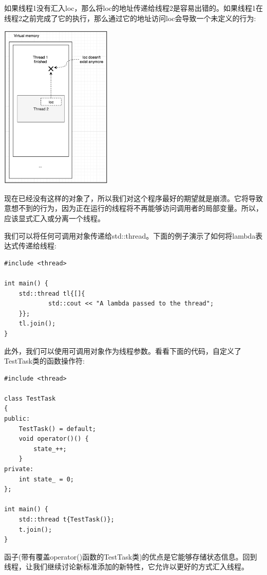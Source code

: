 如果线程1没有汇入loc，那么将loc的地址传递给线程2是容易出错的。如果线程1在线程2之前完成了它的执行，那么通过它的地址访问loc会导致一个未定义的行为: \par

\begin{center}
	\includegraphics[width=0.4\textwidth]{content/Section-2/Chapter-8/13}
\end{center}

现在已经没有这样的对象了，所以我们对这个程序最好的期望就是崩溃。它将导致意想不到的行为，因为正在运行的线程将不再能够访问调用者的局部变量。所以，应该显式汇入或分离一个线程。 \par
我们可以将任何可调用对象传递给std::thread。下面的例子演示了如何将lambda表达式传递给线程: \par

\begin{lstlisting}[caption={}]
#include <thread>

int main() {
	std::thread tl{[]{
			std::cout << "A lambda passed to the thread";
	}};
	tl.join();
}
\end{lstlisting}

此外，我们可以使用可调用对象作为线程参数。看看下面的代码，自定义了TestTask类的函数操作符: \par

\begin{lstlisting}[caption={}]
#include <thread>

class TestTask
{
public:
	TestTask() = default;
	void operator()() {
		state_++;
	}
private:
	int state_ = 0;
};

int main() {
	std::thread t{TestTask()};
	t.join();
}
\end{lstlisting}

函子(带有覆盖operator()函数的TestTask类)的优点是它能够存储状态信息。回到线程，让我们继续讨论新标准添加的新特性，它允许以更好的方式汇入线程。 \par

